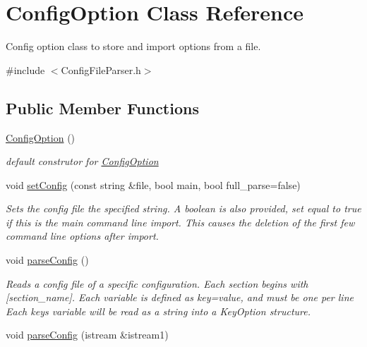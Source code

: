 \hypertarget{class_config_option}{}\section{Config\+Option Class Reference}
\label{class_config_option}


Config option class to store and import options from a file.  




{\ttfamily \#include $<$Config\+File\+Parser.\+h$>$}

\subsection*{Public Member Functions}
\begin{DoxyCompactItemize}
\item 
\hyperlink{class_config_option_ac0639cf9fc6660b1436ebc9e7af52525}{Config\+Option} ()\hypertarget{class_config_option_ac0639cf9fc6660b1436ebc9e7af52525}{}\label{class_config_option_ac0639cf9fc6660b1436ebc9e7af52525}

\begin{DoxyCompactList}\small\item\em default construtor for \hyperlink{class_config_option}{Config\+Option} \end{DoxyCompactList}\item 
void \hyperlink{class_config_option_ac1ae69813100e755359b25b11dfeb8c7}{set\+Config} (const string \&file, bool main, bool full\+\_\+parse=false)
\begin{DoxyCompactList}\small\item\em Sets the config file the specified string. A boolean is also provided, set equal to true if this is the main command line import. This causes the deletion of the first few command line options after import. \end{DoxyCompactList}\item 
void \hyperlink{class_config_option_a45cdefa1516c378e5a90803d594ccd34}{parse\+Config} ()\hypertarget{class_config_option_a45cdefa1516c378e5a90803d594ccd34}{}\label{class_config_option_a45cdefa1516c378e5a90803d594ccd34}

\begin{DoxyCompactList}\small\item\em Reads a config file of a specific configuration. Each section begins with \textquotesingle{}\mbox{[}section\+\_\+name\mbox{]}\textquotesingle{}. Each variable is defined as \textquotesingle{}key=value\textquotesingle{}, and must be one per line Each key\textquotesingle{}s variable will be read as a string into a Key\+Option structure. \end{DoxyCompactList}\item 
void \hyperlink{class_config_option_acc58daf05e74c1e1637a9c06e371c40b}{parse\+Config} (istream \&istream1)\hypertarget{class_config_option_acc58daf05e74c1e1637a9c06e371c40b}{}\label{class_config_option_acc58daf05e74c1e1637a9c06e371c40b}


\end{DoxyCompactItemize}
